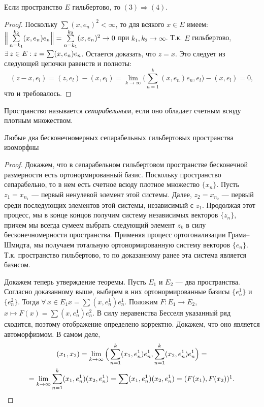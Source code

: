\documentclass[10pt,titlepage, a4paper]{article}
\begin{document}
\begin{theorem}
Если пространство $E$ гильбертово, то $(3)\Rightarrow(4)$.
\end{theorem}

\begin{proof}
Поскольку $\sum(x,e_n)^2<\infty$, то для всякого $x\in E$ имеем:
$\Big\|\sum\limits_{n=k_1}^{k_2}(x,e_n)e_n\Big\|\p=\sum\limits_{n=k_1}^{k_2}
(x,e_n)^2\to 0$ при $k_1,k_2\to\infty$. Т.к. $E$ гильбертово,
$\exists\,z\in E:z\p=\sum(x,e_n)e_n$. Остается доказать, что $z=x$.
Это следует из следующей цепочки равенств и полноты:
$$(z-x,e_l)=(z,e_l)-(x,e_l)=\lim\limits_{k\to\infty}\Big(\sum\limits_{n=1}^k
(x,e_n)e_n, e_l\Big)-(x,e_l)=0,$$ что и требовалось.
\end{proof}

\begin{defen}
Пространство называется \emph{сепарабельным}, если оно обладает
счетным всюду плотным множеством.
\end{defen}

\begin{theorem}
Любые два бесконечномерных сепарабельных гильбертовых пространства
изоморфны
\end{theorem}

\begin{proof}
Докажем, что в сепарабельном гильбертовом простра\-нстве бесконечной
размерности есть ортонормированный базис. Поскольку пространство
сепарабельно, то в нем есть счетное всюду плотное множество
$\{x_n\}$. Пусть $z_1=x_{n_1}$ --- первый ненулевой элемент этой
системы. Далее, $z_2=x_{n_2}$ --- первый среди последующих элементов
этой системы, независимый с $z_1$. Продолжая этот процесс, мы в
конце концов получим систему независимых векторов $\{z_n\}$, причем
мы всегда сумеем выбрать следующий элемент $z_k$ в силу
бесконечномерности пространства. Применяя процесс ортогонализации
Грама--Шмидта, мы получаем тотальную ортонормированную систему
векторов $\{e_n\}$. Т.к. пространство гильбертово, то по доказанному
ранее эта система является базисом.

Докажем теперь утверждение теоремы. Пусть $E_1$ и $E_2$ --- два
пространства. Согласно доказанному выше, выберем в них
ортонормированные базисы $\{e_n^1\}$ и $\{e_n^2\}$. Тогда
$\forall\,x\in E_1$\;\;$x=\sum(x,e_n^1)e_n^1$. Положим $F\colon
E_1\to E_2$, $x\mapsto F(x)=\sum(x,e_n^1)e_n^2$. В силу неравенства
Бесселя указанный ряд сходится, поэтому отображение определено
корректно. Докажем, что оно является автоморфизмом. В самом деле,
\begin{multline*}
(x_1,x_2)=\lim\limits_{k\to\infty}\Big(\sum\limits_{n=1}^k(x_1,e_n^1)e_n^1,
\sum\limits_{n=1}^k(x_2,e_n^1)e_n^1\Big)=\\
=\lim\limits_{k\to\infty} \sum\limits_{n=1}^k(x_1,e_n^1)(x_2,e_n^1)=
\sum\limits(x_1,e_n^1)(x_2,e_n^1)=(F(x_1),F(x_2))\footnotemark.
\end{multline*}
\end{proof}
\end{document}
